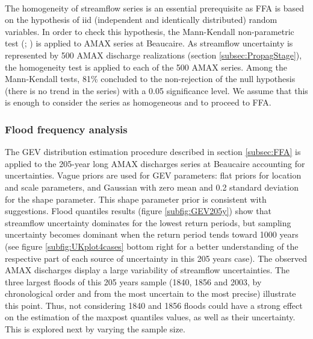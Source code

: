 \documentclass[11pt]{article}
\begin{document}
        \paragraph{}
        The homogeneity of streamflow series is an essential prerequisite as FFA is based on the hypothesis of iid (independent and identically distributed) random variables. In order to check this hypothesis, the Mann-Kendall non-parametric test (\citet{mann_nonparametric_1945}; \citet{kendall_rank_1948}) is applied to AMAX series at Beaucaire. As streamflow uncertainty is represented by 500 AMAX discharge realizations (section \ref{subsec:PropagStage}), the homogeneity test is applied to each of the 500 AMAX series. Among the Mann-Kendall tests, 81\% concluded to the non-rejection of the null hypothesis (there is no trend in the series) with a 0.05 significance level. We assume that this is enough to consider the series as homogeneous and to proceed to FFA. 
        
        \subsubsection{Flood frequency analysis}
        
       The GEV distribution estimation procedure described in section \ref{subsec:FFA} is applied to the 205-year long AMAX discharges series at Beaucaire accounting for uncertainties. Vague priors are used for GEV parameters: flat priors for location and scale parameters, and Gaussian with zero mean and 0.2 standard deviation for the shape parameter. This shape parameter prior is consistent with \citet{martins_generalized_2000} suggestions.
       Flood quantiles results (figure \ref{subfig:GEV205y}) show that streamflow uncertainty dominates for the lowest return periods, but sampling uncertainty becomes dominant when the return period tends toward 1000 years (see figure \ref{subfig:UKplot4cases} bottom right  for a better understanding of the respective part of each source of uncertainty in this 205 years case). The observed AMAX discharges display a large variability of streamflow uncertainties. The three largest floods of this 205 years sample (1840, 1856 and 2003, by chronological order and from the most uncertain to the most precise) illustrate this point. Thus, not considering 1840 and 1856 floods could have a strong effect on the estimation of the maxpost quantiles values, as well as their uncertainty. This is explored next by varying the sample size.
       
        
\end{document}
